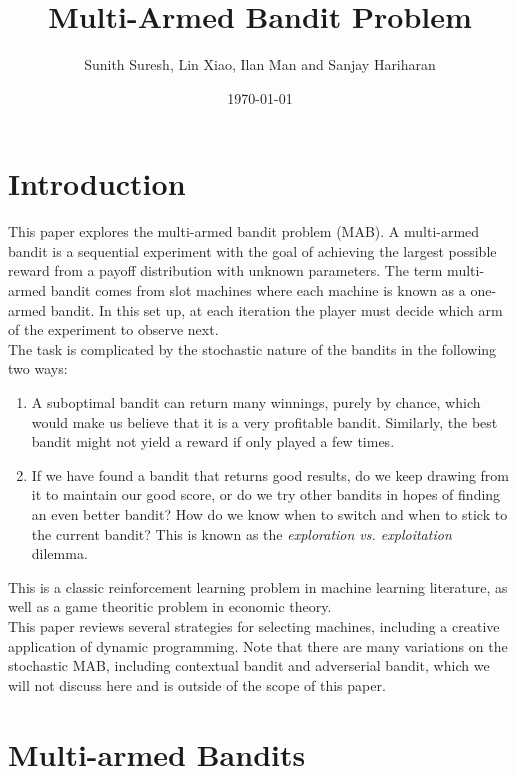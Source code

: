 \documentclass{article}
\title{Multi-Armed Bandit Problem}
\author{Sunith Suresh, Lin Xiao, Ilan Man and Sanjay Hariharan}
\date{\today}
\begin{document}
\maketitle

\section{Introduction}

This paper explores the multi-armed bandit problem (MAB). A multi-armed bandit is a sequential experiment with the goal of achieving the largest possible reward from a payoff distribution with unknown parameters. The term multi-armed bandit comes from slot machines where each machine is known as a one-armed bandit. In this set up, at each iteration the player must decide which arm of the experiment to observe next.\\

The task is complicated by the stochastic nature of the bandits in the following two ways:

\begin{enumerate}
\item A suboptimal bandit can return many winnings, purely by chance, which would make us believe that it is a very profitable bandit. Similarly, the best bandit might not yield a reward if only played a few times.
\item If we have found a bandit that returns good results, do we keep drawing from it to maintain our good score, or do we try other bandits in hopes of finding an even better bandit? How do we know when to switch and when to stick to the current bandit? This is known as the \textit{exploration vs. exploitation} dilemma.
\end{enumerate}

This is a classic reinforcement learning problem in machine learning literature, as well as a game theoritic problem in economic theory.\\

This paper reviews several strategies for selecting machines, including a creative application of dynamic programming. Note that there are many variations on the stochastic MAB, including contextual bandit and adverserial bandit, which we will not discuss here and is outside of the scope of this paper. 

\section{Multi-armed Bandits}
\end{document}
